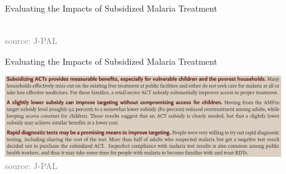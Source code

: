\documentclass[10pt,xcolor=table,ignorenonframetext,handout,aspectratio=169]{beamer}
\begin{document}

\begin{frame}{Evaluating the Impacts of Subsidized Malaria Treatment}

\medskip
\begin{center}
	\\
	\textcolor{gray}{\tiny{source:  J-PAL}}
\end{center}

\end{frame}



\begin{frame}{Evaluating the Impacts of Subsidized Malaria Treatment}

\medskip
\begin{center}
	\includegraphics[width=12cm]{img/JPAL-ACT-conclusions.png}\\
	\textcolor{gray}{\tiny{source:  J-PAL}}
\end{center}

\end{frame}
\end{document}
